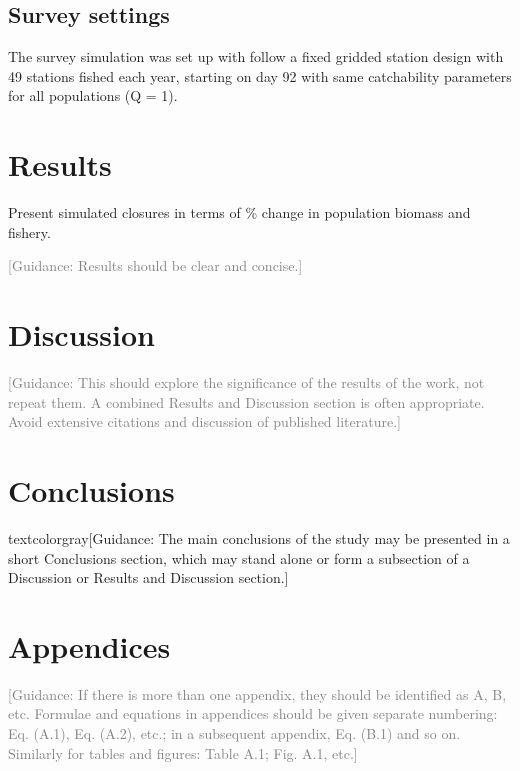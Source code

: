 \documentclass[review]{elsarticle}
\begin{document}
\subsection{Survey settings}

The survey simulation was set up with follow a fixed gridded station design
with 49 stations fished each year, starting on day 92 with same catchability
parameters for all populations (Q = 1). \\

\section{Results}

Present simulated closures in terms of \% change in population biomass and
fishery.

\textcolor{gray}{[Guidance: Results should be clear and concise.]}

\section{Discussion}

\textcolor{gray}{[Guidance: This should explore the significance of the results 
of the work, not repeat them. A combined Results and Discussion section is
often appropriate.  Avoid extensive citations and discussion of published
literature.]}

\section{Conclusions}

textcolor{gray}{[Guidance: The main conclusions of the study may be presented 
in a short Conclusions section, which may stand alone or form a subsection of a
Discussion or Results and Discussion section.]}

\section*{Appendices}

\textcolor{gray}{[Guidance: If there is more than one appendix, they should 
be identified as A, B, etc.  Formulae and equations in appendices should be
given separate numbering: Eq.  (A.1), Eq. (A.2), etc.; in a subsequent
appendix, Eq. (B.1) and so on.  Similarly for tables and figures: Table A.1;
Fig. A.1, etc.]}
\end{document}
